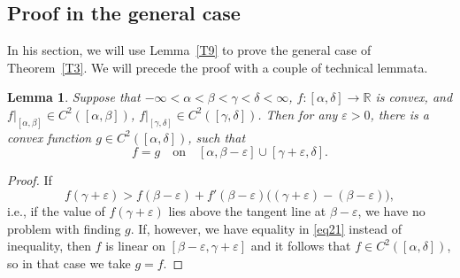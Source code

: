 \documentclass[intlimits,12pt,reqno]{amsart}
\newcommand{\bbbr}{\mathbb R}
\newcommand{\eps}{\varepsilon}
\newtheorem{lemma}[theorem]{Lemma}
\theoremstyle{definition}
\begin{document}
\subsection{Proof in the general case}
\label{uni}
In his section, we will use Lemma~\ref{T9} to prove the general case of Theorem~\ref{T3}.
We will precede the proof with a couple of technical lemmata.
\begin{lemma}
\label{T11}
Suppose that $-\infty<\alpha<\beta<\gamma<\delta<\infty$, $f:[\alpha,\delta]\to\bbbr$ is convex, and $f|_{[\alpha,\beta]}\in C^2([\alpha,\beta])$, $f|_{[\gamma,\delta]}\in C^2([\gamma,\delta])$. Then for any $\eps>0$, there is a convex function $g\in C^2([\alpha,\delta])$, such that
$$
f=g
\quad
\text{on}
\quad
[\alpha,\beta-\eps]\cup [\gamma+\eps,\delta].
$$
\end{lemma}
\begin{proof}
If
\begin{equation}
\label{eq21}
f(\gamma+\eps)> f(\beta-\eps)+f'(\beta-\eps)\big((\gamma+\eps)-(\beta-\eps)\big),
\end{equation}
i.e., if the value of $f(\gamma+\eps)$ lies above the tangent line at $\beta-\eps$, we have no problem with finding $g$. If, however, we have equality in \eqref{eq21} instead of inequality, then $f$ is linear on $[\beta-\eps,\gamma+\eps]$ and it follows that $f\in C^2([\alpha,\delta])$, so in that case we take $g=f$.
\end{proof}
\end{document}

